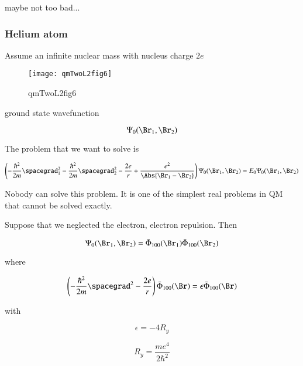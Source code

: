 maybe not too bad...

\subsubsection{Helium atom}

Assume an infinite nuclear mass with nucleus charge $2 e$

\begin{figure}[htp]
\centering
\texttt{[image: qmTwoL2fig6]}
\caption{qmTwoL2fig6}\label{fig:qmTwoL2fig6}
\end{figure}

ground state wavefunction

\begin{equation}\label{eqn:qmTwoL2:490}
\Psi_0(\Br_1, \Br_2)
\end{equation}

The problem that we want to solve is

\begin{equation}\label{eqn:qmTwoL2:510}
\left(
-\frac{\hbar^2}{2 m} \spacegrad_1^2
-\frac{\hbar^2}{2 m} \spacegrad_2^2
- \frac{2 e}{r}
+
\frac{e^2}{\Abs{\Br_1 - \Br_2}}
\right)
\Psi_0(\Br_1, \Br_2) = E_0 \Psi_0(\Br_1, \Br_2)
\end{equation}

Nobody can solve this problem.  It is one of the simplest real problems in QM that cannot be solved exactly.

Suppose that we neglected the electron, electron repulsion.  Then

\begin{equation}\label{eqn:qmTwoL2:530}
\Psi_0(\Br_1, \Br_2)
=
\bar{\Phi}_{100}(\Br_1)
\bar{\Phi}_{100}(\Br_2)
\end{equation}

where

\begin{equation}\label{eqn:qmTwoL2:550}
\left( -\frac{\hbar^2}{2 m} \spacegrad^2
- \frac{2 e}{r} \right)
\bar{\Phi}_{100}(\Br) = \epsilon \bar{\Phi}_{100}(\Br)
\end{equation}

with

\begin{equation}\label{eqn:qmTwoL2:570}
\epsilon = - 4 R_y
\end{equation}

\begin{equation}\label{eqn:qmTwoL2:590}
R_y = \frac{m e^4}{2 \hbar^2}
\end{equation}

